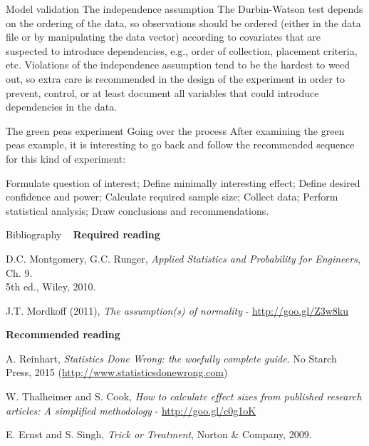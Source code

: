 \documentclass[t]{beamer}
\begin{document}

\begin{ftstf}
{Model validation}
{The independence assumption}
The Durbin-Watson test depends on the ordering of the data, so observations should be ordered (either in the data file or by manipulating the data vector) according to covariates that are suspected to introduce dependencies, e.g., order of collection, placement criteria, etc.
\vone
Violations of the independence assumption tend to be the hardest to weed out, so extra care is recommended in the design of the experiment in order to prevent, control, or at least document all variables that could introduce dependencies in the data.
\end{ftstf}


\begin{ftst}
{The green peas experiment}
{Going over the process}
After examining the green peas example, it is interesting to go back and follow the recommended sequence for this kind of experiment:

\bitems Formulate question of interest;
	\spitem Define minimally interesting effect;
	\spitem Define desired confidence and power;
	\spitem Calculate required sample size;
	\spitem Collect data;
	\spitem Perform statistical analysis;
	\spitem Draw conclusions and recommendations.
\eitem
{}
\end{ftst}



\begin{ftst}
{Bibliography}
{\ }
\scriptsize
\textbf{Required reading}

\benums D.C. Montgomery, G.C. Runger, \textit{Applied Statistics and Probability for Engineers}, Ch. 9.\\5th ed., Wiley, 2010. 
\item J.T. Mordkoff (2011), \textit{The assumption(s) of normality} - \url{http://goo.gl/Z3w8ku}
\eenum

\textbf{Recommended reading}

\benums A. Reinhart, \textit{Statistics Done Wrong: the woefully complete guide}. No Starch Press, 2015 ({\tiny\url{http://www.statisticsdonewrong.com}})
\item W. Thalheimer and S. Cook, \textit{How to calculate effect sizes from published research articles: A simplified methodology} - {\tiny\url{http://goo.gl/c0g1oK}}
\item E. Ernst and S. Singh, \textit{Trick or Treatment}, Norton \& Company, 2009.
\eenum
\end{ftst}



\end{document}
